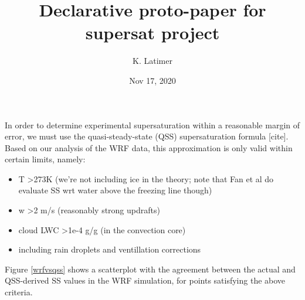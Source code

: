 \documentclass{article}
\title{Declarative proto-paper for supersat project}
\author{K. Latimer}
\date{Nov 17, 2020}
\begin{document}
\maketitle

In order to determine experimental supersaturation within a reasonable margin of error, we must use the quasi-steady-state (QSS) supersaturation formula [cite]. Based on our analysis of the WRF data, this approximation is only valid within certain limits, namely:
\begin{itemize}
	\item T \textgreater  273K (we're not including ice in the theory; note that Fan et al do evaluate SS wrt water above the freezing line though)
	\item w \textgreater  2 m/s (reasonably strong updrafts)
	\item cloud LWC \textgreater  1e-4 g/g (in the convection core)
	\item including rain droplets and ventillation corrections
\end{itemize}

Figure \ref{wrfvsqss} shows a scatterplot with the agreement between the actual and QSS-derived SS values in the WRF simulation, for points satisfying the above criteria.

\clearpage
\newpage
\end{document}
